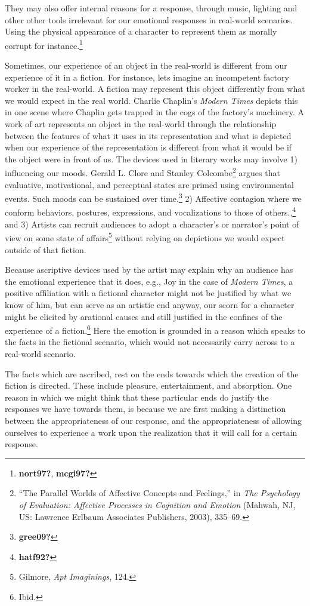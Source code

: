 \documentclass[
  12pt,
]{book}
\theoremstyle{definition}
\theoremstyle{definition}
\theoremstyle{definition}
\theoremstyle{definition}
\theoremstyle{remark}
\begin{document}
They may also offer internal reasons for a response, through music, lighting and other other tools irrelevant for our emotional responses in real-world scenarios. Using the physical appearance of a character to represent them as morally corrupt for instance.\footnote{\textbf{nort97?}, \textbf{mcgi97?}}

Sometimes, our experience of an object in the real-world is different from our experience of it in a fiction. For instance, lets imagine an incompetent factory worker in the real-world. A fiction may represent this object differently from what we would expect in the real world. Charlie Chaplin's \emph{Modern Times} depicts this in one scene where Chaplin gets trapped in the cogs of the factory's machinery. A work of art represents an object in the real-world through the relationship between the features of what it uses in its representation and what is depicted when our experience of the representation is different from what it would be if the object were in front of us. The devices used in literary works may involve 1) influencing our moods. Gerald L. Clore and Stanley Colcombe\footnote{{``The Parallel Worlds of Affective Concepts and Feelings,''} in \emph{The Psychology of Evaluation: {Affective} Processes in Cognition and Emotion} (Mahwah, NJ, US: Lawrence Erlbaum Associates Publishers, 2003), 335--69.} argues that evaluative, motivational, and perceptual states are primed using environmental events. Such moods can be sustained over time.\footnote{\textbf{gree09?}} 2) Affective contagion where we conform behaviors, postures, expressions, and vocalizations to those of others.,\footnote{\textbf{hatf92?}} and 3) Artists can recruit audiences to adopt a character's or narrator's point of view on some state of affairs\footnote{Gilmore, \emph{Apt {Imaginings}}, 124.} without relying on depictions we would expect outside of that fiction.

Because ascriptive devices used by the artist may explain why an audience has the emotional experience that it does, e.g., Joy in the case of \emph{Modern Times}, a positive affiliation with a fictional character might not be justified by what we know of him, but can serve as an artistic end anyway, our scorn for a character might be elicited by arational causes and still justified in the confines of the experience of a fiction.\footnote{Ibid.} Here the emotion is grounded in a reason which speaks to the facts in the fictional scenario, which would not necessarily carry across to a real-world scenario.

The facts which are ascribed, rest on the ends towards which the creation of the fiction is directed. These include pleasure, entertainment, and absorption. One reason in which we might think that these particular ends do justify the responses we have towards them, is because we are first making a distinction between the appropriateness of our response, and the appropriateness of allowing ourselves to experience a work upon the realization that it will call for a certain response.
\end{document}
